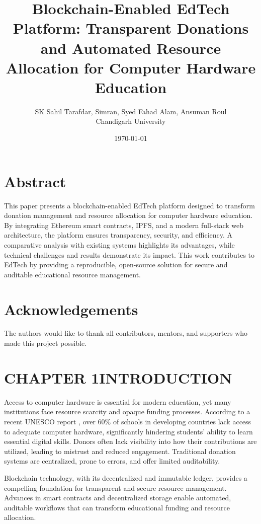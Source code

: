 \documentclass[a4paper,12pt]{report}
\newcommand{\mychapter}[2]{
    \setcounter{chapter}{#1}
    \setcounter{section}{0}
    \setcounter{table}{0}
    \setcounter{figure}{0}
    \chapter*{#2}
    \addcontentsline{toc}{chapter}{#2}
}
\begin{document}
	\title{Blockchain-Enabled EdTech Platform: Transparent Donations and Automated Resource Allocation for Computer Hardware Education}
\author{SK Sahil Tarafdar, Simran, Syed Fahad Alam, Ansuman Roul \\ Chandigarh University}
\date{\today}
\maketitle
{}
\chapter*{Abstract}
This paper presents a blockchain-enabled EdTech platform designed to transform donation management and resource allocation for computer hardware education. By integrating Ethereum smart contracts, IPFS, and a modern full-stack web architecture, the platform ensures transparency, security, and efficiency. A comparative analysis with existing systems highlights its advantages, while technical challenges and results demonstrate its impact. This work contributes to EdTech by providing a reproducible, open-source solution for secure and auditable educational resource management.
\newpage
\chapter*{Acknowledgements}
The authors would like to thank all contributors, mentors, and supporters who made this project possible.
	\tableofcontents
\newpage
{}
\listoftables
\newpage
{}
\listoffigures
\newpage
\mychapter{1}{CHAPTER 1\quad INTRODUCTION}
Access to computer hardware is essential for modern education, yet many institutions face resource scarcity and opaque funding processes. According to a recent UNESCO report \cite{b15}, over 60\% of schools in developing countries lack access to adequate computer hardware, significantly hindering students' ability to learn essential digital skills. Donors often lack visibility into how their contributions are utilized, leading to mistrust and reduced engagement. Traditional donation systems are centralized, prone to errors, and offer limited auditability.

Blockchain technology, with its decentralized and immutable ledger, provides a compelling foundation for transparent and secure resource management. Advances in smart contracts and decentralized storage enable automated, auditable workflows that can transform educational funding and resource allocation.
\end{document}
